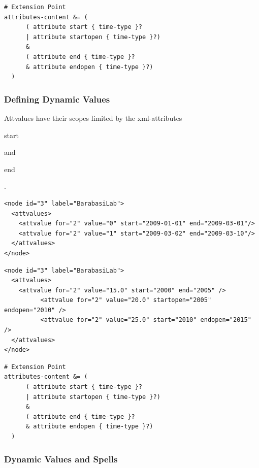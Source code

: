 \documentclass[a4paper,10pt]{article}
\begin{document}
\lstset{ style=rnc }
\begin{lstlisting}[caption={Dynamic Attributes Specification},label=dyndataRNC]
# Extension Point
attributes-content &= (
      ( attribute start { time-type }?
      | attribute startopen { time-type }?)
      &
      ( attribute end { time-type }?
      & attribute endopen { time-type }?)
  )
\end{lstlisting}

\subsubsection{Defining Dynamic Values}

Attvalues have their scopes limited by the xml-attributes \begin{footnotesize}start\end{footnotesize} and \begin{footnotesize}end\end{footnotesize}.

\lstset{ style=gexf }
\begin{lstlisting}[caption={Data value changing over time}]
<node id="3" label="BarabasiLab">
  <attvalues>
    <attvalue for="2" value="0" start="2009-01-01" end="2009-03-01"/>
    <attvalue for="2" value="1" start="2009-03-02" end="2009-03-10"/>
  </attvalues>
</node>
\end{lstlisting}

\lstset{ style=gexf }
\begin{lstlisting}[caption={Using open and closed intervals}]
<node id="3" label="BarabasiLab">
  <attvalues>
    <attvalue for="2" value="15.0" start="2000" end="2005" />
          <attvalue for="2" value="20.0" startopen="2005" endopen="2010" />
          <attvalue for="2" value="25.0" start="2010" endopen="2015" />
  </attvalues>
</node>
\end{lstlisting}

\lstset{ style=rnc }
\begin{lstlisting}[caption={Dynamic Values Specification},label=dynvalRNC]
# Extension Point
attributes-content &= (
      ( attribute start { time-type }?
      | attribute startopen { time-type }?)
      &
      ( attribute end { time-type }?
      & attribute endopen { time-type }?)
  )
\end{lstlisting}

\subsubsection{Dynamic Values and Spells}
\end{document}
